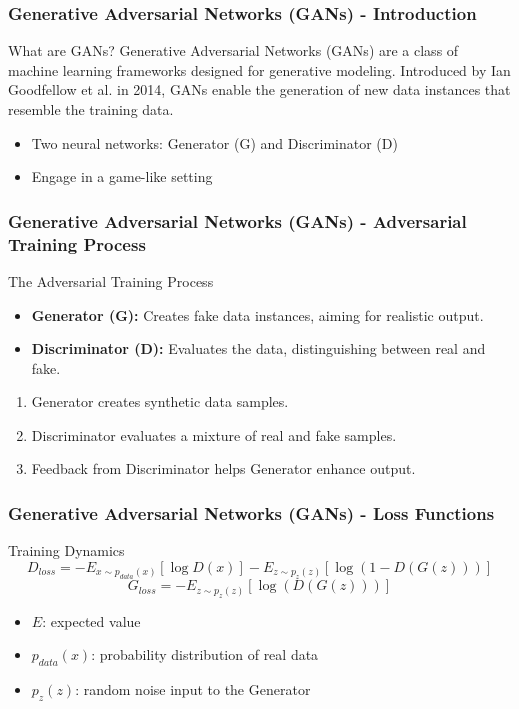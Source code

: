 \documentclass[aspectratio=169]{beamer}
\begin{document}
\begin{frame}[fragile]
    \frametitle{Generative Adversarial Networks (GANs) - Introduction}
    \begin{block}{What are GANs?}
        Generative Adversarial Networks (GANs) are a class of machine learning frameworks designed for generative modeling. Introduced by Ian Goodfellow et al. in 2014, GANs enable the generation of new data instances that resemble the training data.
    \end{block}
    \begin{itemize}
        \item Two neural networks: Generator (G) and Discriminator (D)
        \item Engage in a game-like setting
    \end{itemize}
\end{frame}

\begin{frame}[fragile]
    \frametitle{Generative Adversarial Networks (GANs) - Adversarial Training Process}
    \begin{block}{The Adversarial Training Process}
        \begin{itemize}
            \item \textbf{Generator (G):} Creates fake data instances, aiming for realistic output.
            \item \textbf{Discriminator (D):} Evaluates the data, distinguishing between real and fake.
        \end{itemize}
    \end{block}
    \begin{enumerate}
        \item Generator creates synthetic data samples.
        \item Discriminator evaluates a mixture of real and fake samples.
        \item Feedback from Discriminator helps Generator enhance output.
    \end{enumerate}
\end{frame}

\begin{frame}[fragile]
    \frametitle{Generative Adversarial Networks (GANs) - Loss Functions}
    \begin{block}{Training Dynamics}
        \begin{equation}
            D_{loss} = -E_{x \sim p_{data}(x)}[\log D(x)] - E_{z \sim p_z(z)}[\log(1 - D(G(z)))]
        \end{equation}
        \begin{equation}
            G_{loss} = -E_{z \sim p_z(z)}[\log(D(G(z)))]
        \end{equation}
        \begin{itemize}
            \item $E$: expected value
            \item $p_{data}(x)$: probability distribution of real data
            \item $p_z(z)$: random noise input to the Generator
        \end{itemize}
    \end{block}
\end{frame}
\end{document}
